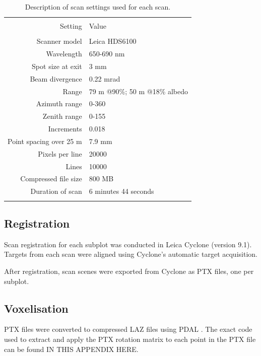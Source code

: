 \documentclass[11pt,a4paper]{article}
\newcommand{\textapprox}{\raisebox{0.5ex}{\texttildelow}}  %
\begin{document}
\begin{table}[H] \centering 
  \caption{Description of scan settings used for each scan.} 
  \label{scan_settings} 
\begin{tabular}{@{\extracolsep{0pt}} rl} 
\\[-1.8ex]\hline 
\hline \\[-1.8ex] 
{Setting} & {Value} \\
\hline \\[-1.8ex] 
Scanner model & Leica HDS6100 \\
Wavelength & 650-690 nm \\
Spot size at exit & 3 mm \\
Beam divergence & 0.22 mrad \\
Range & 79 m @90\%; 50 m @18\% albedo \\
Azimuth range & 0-360\textdegree{} \\
Zenith range & 0-155\textdegree{} \\
Increments & 0.018\textdegree{} \\
Point spacing over 25 m & 7.9 mm \\
Pixels per line & 20000 \\
Lines & 10000 \\
Compressed file size & \textapprox{}800 MB \\
Duration of scan & 6 minutes 44 seconds \\
\hline
\hline \\[-1.8ex] 
\end{tabular} 
\end{table} 

\subsection{Registration}

Scan registration for each subplot was conducted in Leica Cyclone (version 9.1). Targets from each scan were aligned using Cyclone's automatic target acquisition. 

After registration, scan scenes were exported from Cyclone as PTX files, one per subplot.

\subsection{Voxelisation}

PTX files were converted to compressed LAZ files using PDAL \citep{}. The exact code used to extract and apply the PTX rotation matrix to each point in the PTX file can be found IN THIS APPENDIX HERE. 
\end{document}
